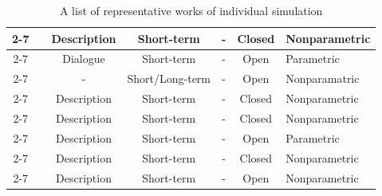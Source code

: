 \begin{table}[!htp]
\begin{tabularx}{\linewidth}{c|>{\centering\arraybackslash}X|c|c|c|c|>{\centering\arraybackslash}m{8em}}
		\cmidrule{2-7}
		& \cite{Lee_2024} & Description & Short-term & - & Closed  & Nonparametric  \\
		\cmidrule{2-7}
		& \cite{li2024culturellmincorporatingculturaldifferences} & Dialogue & Short-term & - & Open  & Parametric  \\
		\cmidrule{2-7}
		& \cite{weng2024controllmcraftingdiversepersonalities} & - & Short/Long-term & - & Open  & Nonparamatric  \\
		\cmidrule{2-7}
		& \cite{sun2024randomsiliconsamplingsimulating} & Description & Short-term & - & Closed  & Nonparametric  \\
		\cmidrule{2-7}
		& \cite{Bisbee_Clinton_Dorff_Kenkel_Larson_2024} & Description & Short-term & - & Closed  & Nonparametric  \\
		\cmidrule{2-7}
		& \cite{ge2024scalingsyntheticdatacreation} & Description & Short-term & - & Open  & Parametric  \\
		\cmidrule{2-7}
		& \cite{Qu2024PerformanceAB} & Description & Short-term & - & Closed  & Nonparametric  \\
		\cmidrule{2-7}
		& \cite{qiu2024interactiveagentssimulatingcounselorclient} & Description & Short-term & - & Open  & Nonparametric  \\
		\bottomrule
	\end{tabularx}
    \caption{A list of representative works of individual simulation}
\end{table}

